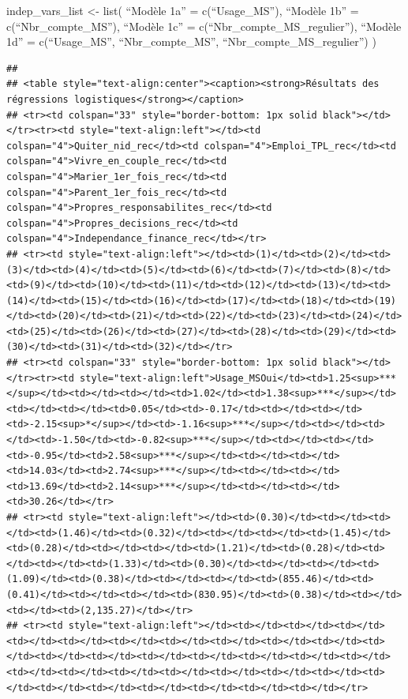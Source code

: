 \documentclass[
]{article}
\begin{document}
indep\_vars\_list \textless- list( ``Modèle 1a'' = c(``Usage\_MS''),
``Modèle 1b'' = c(``Nbr\_compte\_MS''), ``Modèle 1c'' =
c(``Nbr\_compte\_MS\_regulier''), ``Modèle 1d'' = c(``Usage\_MS'',
``Nbr\_compte\_MS'', ``Nbr\_compte\_MS\_regulier'') )

\begin{verbatim}
## 
## <table style="text-align:center"><caption><strong>Résultats des régressions logistiques</strong></caption>
## <tr><td colspan="33" style="border-bottom: 1px solid black"></td></tr><tr><td style="text-align:left"></td><td colspan="4">Quiter_nid_rec</td><td colspan="4">Emploi_TPL_rec</td><td colspan="4">Vivre_en_couple_rec</td><td colspan="4">Marier_1er_fois_rec</td><td colspan="4">Parent_1er_fois_rec</td><td colspan="4">Propres_responsabilites_rec</td><td colspan="4">Propres_decisions_rec</td><td colspan="4">Independance_finance_rec</td></tr>
## <tr><td style="text-align:left"></td><td>(1)</td><td>(2)</td><td>(3)</td><td>(4)</td><td>(5)</td><td>(6)</td><td>(7)</td><td>(8)</td><td>(9)</td><td>(10)</td><td>(11)</td><td>(12)</td><td>(13)</td><td>(14)</td><td>(15)</td><td>(16)</td><td>(17)</td><td>(18)</td><td>(19)</td><td>(20)</td><td>(21)</td><td>(22)</td><td>(23)</td><td>(24)</td><td>(25)</td><td>(26)</td><td>(27)</td><td>(28)</td><td>(29)</td><td>(30)</td><td>(31)</td><td>(32)</td></tr>
## <tr><td colspan="33" style="border-bottom: 1px solid black"></td></tr><tr><td style="text-align:left">Usage_MSOui</td><td>1.25<sup>***</sup></td><td></td><td></td><td>1.02</td><td>1.38<sup>***</sup></td><td></td><td></td><td>0.05</td><td>-0.17</td><td></td><td></td><td>-2.15<sup>*</sup></td><td>-1.16<sup>***</sup></td><td></td><td></td><td>-1.50</td><td>-0.82<sup>***</sup></td><td></td><td></td><td>-0.95</td><td>2.58<sup>***</sup></td><td></td><td></td><td>14.03</td><td>2.74<sup>***</sup></td><td></td><td></td><td>13.69</td><td>2.14<sup>***</sup></td><td></td><td></td><td>30.26</td></tr>
## <tr><td style="text-align:left"></td><td>(0.30)</td><td></td><td></td><td>(1.46)</td><td>(0.32)</td><td></td><td></td><td>(1.45)</td><td>(0.28)</td><td></td><td></td><td>(1.21)</td><td>(0.28)</td><td></td><td></td><td>(1.33)</td><td>(0.30)</td><td></td><td></td><td>(1.09)</td><td>(0.38)</td><td></td><td></td><td>(855.46)</td><td>(0.41)</td><td></td><td></td><td>(830.95)</td><td>(0.38)</td><td></td><td></td><td>(2,135.27)</td></tr>
## <tr><td style="text-align:left"></td><td></td><td></td><td></td><td></td><td></td><td></td><td></td><td></td><td></td><td></td><td></td><td></td><td></td><td></td><td></td><td></td><td></td><td></td><td></td><td></td><td></td><td></td><td></td><td></td><td></td><td></td><td></td><td></td><td></td><td></td><td></td><td></td></tr>

\end{verbatim}
\end{document}
